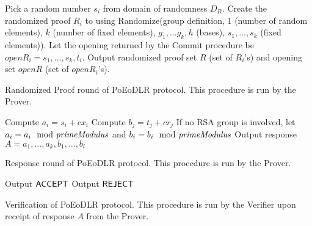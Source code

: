 \begin{algorithm}[H]\label{randProofPoEoDLR}
\dontprintsemicolon

\BlankLine

 \;
\Indp
    {Pick a random number $s_i$ from domain of randomness $D_R$. \;}
    {Create the randomized proof $R_i$ to using Randomize(group definition, $1$ (number of random elements), $k$ (number of fixed elements), $g_1,...g_k,h$ (bases), $s_1,\ldots,s_k$ (fixed elements)). Let the opening returned by the Commit procedure be $openR_i = s_1,\ldots,s_k,t_i$. \;}
  Output randomized proof set $R$ (set of $R_i$'s) and opening set $openR$ (set of $openR_i$'s). \;
\Indm

\caption{Randomized Proof round of PoEoDLR protocol. This procedure is run by the Prover.}
\end{algorithm}



\begin{algorithm}[H]\label{respondPoEoDLR}
\dontprintsemicolon

\BlankLine

 \;
\Indp
    {Compute $a_i = s_i + c x_i$ \;}
    {Compute $b_j = t_j + c r_j$ \;}
  If no RSA group is involved, let $ a_i = a_i \mod {\mathit{primeModulus}} $ and $ b_i = b_i \mod {\mathit{primeModulus}} $ \;
  Output response $A = a_1,\ldots,a_k,b_1,\ldots,b_l$ \;
\Indm

\caption{Response round of PoEoDLR protocol. This procedure is run by the Prover.}
\end{algorithm}



\begin{algorithm}[H]\label{verifyPoEoDLR}
\dontprintsemicolon

\BlankLine

 \;
\Indp
    {Output $\mathsf{ACCEPT}$ \;}
  \Else
    {Output $\mathsf{REJECT}$ \;}
\Indm

\caption{Verification of PoEoDLR protocol. This procedure is run by the Verifier upon receipt of response $A$ from the Prover.}
\end{algorithm}



